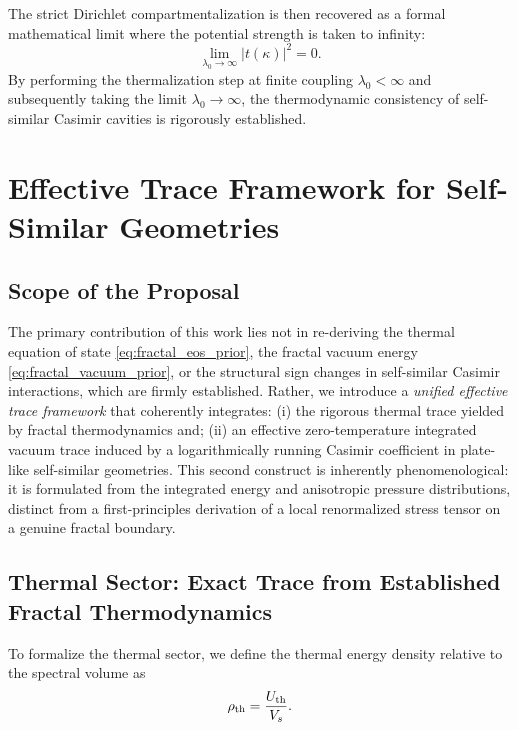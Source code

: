 \documentclass[12pt,letterpaper]{article}
\begin{document}
The strict Dirichlet compartmentalization is then recovered as a formal mathematical limit where the potential strength is taken to infinity:
\begin{equation}
\lim_{\lambda_0 \to \infty} |t(\kappa)|^2 = 0.
\label{eq:SI_dirichlet_limit}
\end{equation}
By performing the thermalization step at finite coupling $\lambda_0 < \infty$ and subsequently taking the limit $\lambda_0 \to \infty$, the thermodynamic consistency of self-similar Casimir cavities is rigorously established.

\section{Effective Trace Framework for Self-Similar Geometries}
\label{sec:novel}

\subsection{Scope of the Proposal}

The primary contribution of this work lies not in re-deriving the thermal equation of state \eqref{eq:fractal_eos_prior}, the fractal vacuum energy \eqref{eq:fractal_vacuum_prior}, or the structural sign changes in self-similar Casimir interactions, which are firmly established.
Rather, we introduce a \emph{unified effective trace framework} that coherently integrates: (i) the rigorous thermal trace yielded by fractal thermodynamics and;
(ii) an effective zero-temperature integrated vacuum trace induced by a logarithmically running Casimir coefficient in plate-like self-similar geometries.
This second construct is inherently phenomenological: it is formulated from the integrated energy and anisotropic pressure distributions, distinct from a first-principles derivation of a local renormalized stress tensor on a genuine fractal boundary.

\subsection{Thermal Sector: Exact Trace from Established Fractal Thermodynamics}

To formalize the thermal sector, we define the thermal energy density relative to the spectral volume as
\begin{equation}
\rho_{\rm th}=\frac{U_{\rm th}}{V_s}.
\end{equation}
\end{document}
